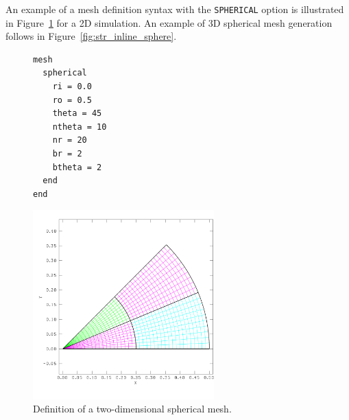 
An example of a mesh definition syntax with the
\texttt{SPHERICAL} option is illustrated in
Figure~\ref{fig:test_radial} for a 2D simulation.  An example of 3D
spherical mesh generation follows in
Figure~\ref{fig:str_inline_sphere}.

\begin{figure}[htb]
  \centering
  \begin{minipage}[c]{0.4\linewidth}
    \centering
{\ttfamily \begin{verbatim}
mesh
  spherical
    ri = 0.0
    ro = 0.5
    theta = 45
    ntheta = 10
    nr = 20
    br = 2
    btheta = 2
  end
end
\end{verbatim}}
  \end{minipage}%
  \hfil
  \begin{minipage}[c]{0.6\linewidth}
    \centering
      \includegraphics[width=2.75in]{test_radial}
  \end{minipage}
  \caption{Definition of a two-dimensional spherical mesh.}
  \label{fig:test_radial}
\end{figure}


